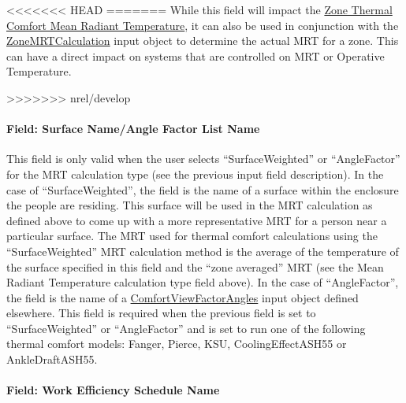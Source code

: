 <<<<<<< HEAD
=======
While this field will impact the \hyperref[zone-thermal-comfort-mean-radiant-temperature-c]{Zone Thermal Comfort Mean Radiant Temperature}, it can also be used in conjunction with the \hyperref[zonemrtcalculation]{ZoneMRTCalculation} input object to determine the actual MRT for a zone. This can have a direct impact on systems that are controlled on MRT or Operative Temperature.

>>>>>>> nrel/develop
\paragraph{Field: Surface Name/Angle Factor List Name}\label{field-surface-nameangle-factor-list-name}

This field is only valid when the user selects ``SurfaceWeighted'' or ``AngleFactor'' for the MRT calculation type (see the previous input field description). In the case of ``SurfaceWeighted'', the field is the name of a surface within the enclosure the people are residing. This surface will be used in the MRT calculation as defined above to come up with a more representative MRT for a person near a particular surface. The MRT used for thermal comfort calculations using the ``SurfaceWeighted'' MRT calculation method is the average of the temperature of the surface specified in this field and the ``zone averaged'' MRT (see the Mean Radiant Temperature calculation type field above). In the case of ``AngleFactor'', the field is the name of a \hyperref[comfortviewfactorangles]{ComfortViewFactorAngles} input object defined elsewhere. This field is required when the previous field is set to ``SurfaceWeighted'' or ``AngleFactor'' and is set to run one of the following thermal comfort models: Fanger, Pierce, KSU, CoolingEffectASH55 or AnkleDraftASH55.

\paragraph{Field: Work Efficiency Schedule Name}\label{field-work-efficiency-schedule-name}

